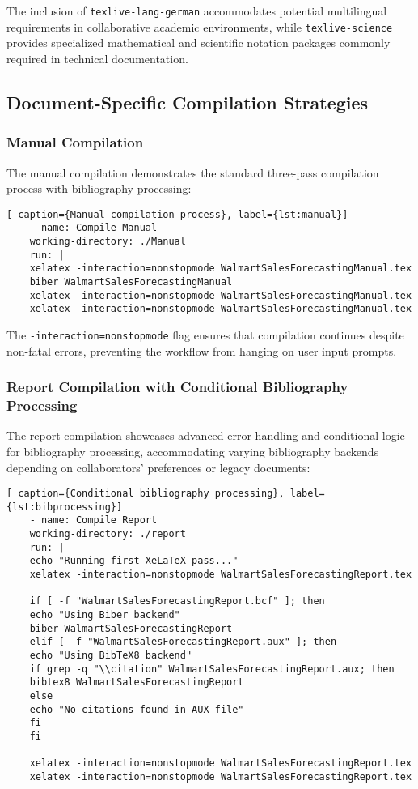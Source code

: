 The inclusion of \texttt{texlive-lang-german} accommodates potential multilingual requirements in collaborative academic environments, while \texttt{texlive-science} provides specialized mathematical and scientific notation packages commonly required in technical documentation.

\subsection{Document-Specific Compilation Strategies}

\subsubsection{Manual Compilation}

The manual compilation demonstrates the standard three-pass compilation process with bibliography processing:

\begin{lstlisting}[breaklines=true][ caption={Manual compilation process}, label={lst:manual}]
	- name: Compile Manual
	working-directory: ./Manual
	run: |
	xelatex -interaction=nonstopmode WalmartSalesForecastingManual.tex
	biber WalmartSalesForecastingManual
	xelatex -interaction=nonstopmode WalmartSalesForecastingManual.tex
	xelatex -interaction=nonstopmode WalmartSalesForecastingManual.tex
\end{lstlisting}

The \texttt{-interaction=nonstopmode} flag ensures that compilation continues despite non-fatal errors, preventing the workflow from hanging on user input prompts.

\subsubsection{Report Compilation with Conditional Bibliography Processing}

The report compilation showcases advanced error handling and conditional logic for bibliography processing, accommodating varying bibliography backends depending on collaborators' preferences or legacy documents:

\begin{lstlisting}[breaklines=true][ caption={Conditional bibliography processing}, label={lst:bibprocessing}]
	- name: Compile Report
	working-directory: ./report
	run: |
	echo "Running first XeLaTeX pass..."
	xelatex -interaction=nonstopmode WalmartSalesForecastingReport.tex
	
	if [ -f "WalmartSalesForecastingReport.bcf" ]; then
	echo "Using Biber backend"
	biber WalmartSalesForecastingReport
	elif [ -f "WalmartSalesForecastingReport.aux" ]; then
	echo "Using BibTeX8 backend"
	if grep -q "\\citation" WalmartSalesForecastingReport.aux; then
	bibtex8 WalmartSalesForecastingReport
	else
	echo "No citations found in AUX file"
	fi
	fi
	
	xelatex -interaction=nonstopmode WalmartSalesForecastingReport.tex
	xelatex -interaction=nonstopmode WalmartSalesForecastingReport.tex
\end{lstlisting}

